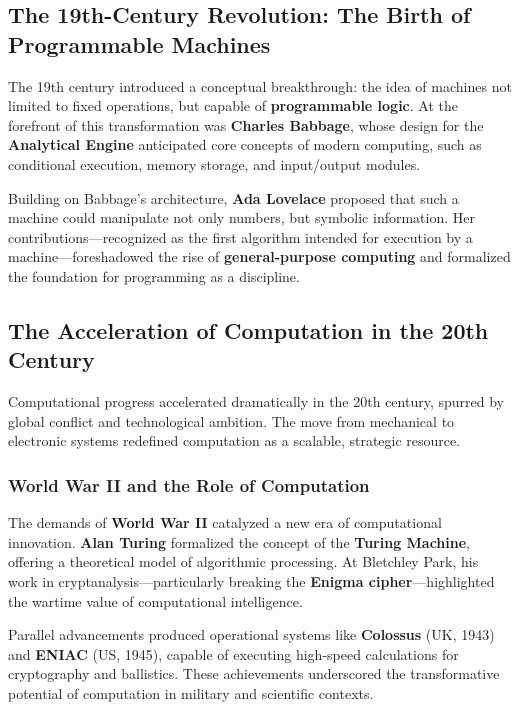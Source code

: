 \subsection{The 19th-Century Revolution: The Birth of Programmable Machines}

The 19th century introduced a conceptual breakthrough: the idea of machines not limited to fixed operations, but capable of \textbf{programmable logic}. At the forefront of this transformation was \textbf{Charles Babbage}, whose design for the \textbf{Analytical Engine} anticipated core concepts of modern computing, such as conditional execution, memory storage, and input/output modules.

Building on Babbage’s architecture, \textbf{Ada Lovelace} proposed that such a machine could manipulate not only numbers, but symbolic information. Her contributions—recognized as the first algorithm intended for execution by a machine—foreshadowed the rise of \textbf{general-purpose computing} and formalized the foundation for programming as a discipline.

\subsection{The Acceleration of Computation in the 20th Century}

Computational progress accelerated dramatically in the 20th century, spurred by global conflict and technological ambition. The move from mechanical to electronic systems redefined computation as a scalable, strategic resource.

\subsubsection{World War II and the Role of Computation}

The demands of \textbf{World War II} catalyzed a new era of computational innovation. \textbf{Alan Turing} formalized the concept of the \textbf{Turing Machine}, offering a theoretical model of algorithmic processing. At Bletchley Park, his work in cryptanalysis—particularly breaking the \textbf{Enigma cipher}—highlighted the wartime value of computational intelligence.

Parallel advancements produced operational systems like \textbf{Colossus} (UK, 1943) and \textbf{ENIAC} (US, 1945), capable of executing high-speed calculations for cryptography and ballistics. These achievements underscored the transformative potential of computation in military and scientific contexts.

